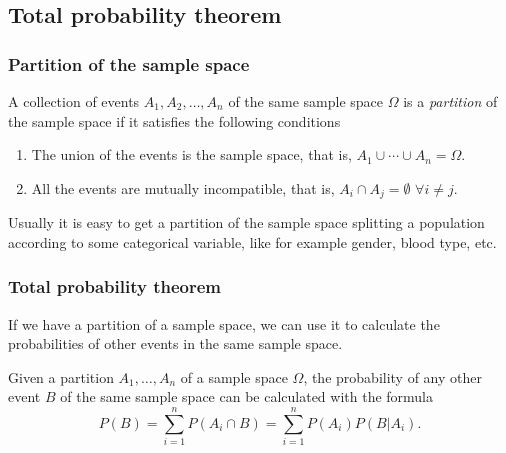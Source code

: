 \subsection{Total probability theorem}

\begin{frame}
\frametitle{Partition of the sample space}
\begin{definition}
A collection of events $A_1,A_2,\ldots,A_n$ of the same sample space $\Omega$ is a \emph{partition} of the sample space if it satisfies the following conditions
\begin{enumerate}
\item The union of the events is the sample space, that is, $A_1\cup \cdots\cup A_n =\Omega$.
\item All the events are mutually incompatible, that is, $A_i\cap A_j = \emptyset$ $\forall i\neq j$.
\end{enumerate}
\end{definition}

\begin{center}

\end{center}

Usually it is easy to get a partition of the sample space splitting a population according to some categorical variable, like for example gender, blood type, etc.
\end{frame}


\begin{frame}
\frametitle{Total probability theorem}
If we have a partition of a sample space, we can use it to calculate the probabilities of other events in the same sample space.
\begin{theorem}
Given a partition $A_1,\ldots,A_n$ of a sample space $\Omega$, the probability of any other event $B$ of the same sample
space can be calculated with the formula
\[
P(B) = \sum_{i=1}^n P(A_i\cap B) = \sum_{i=1}^n P(A_i)P(B|A_i).
\]
\end{theorem}
\end{frame}


